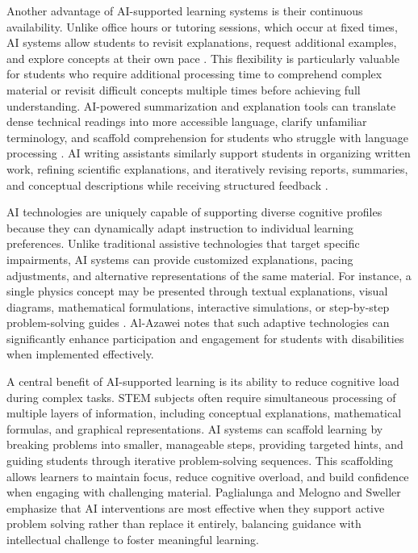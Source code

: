 \documentclass[]{aastex701}
\begin{document}
Another advantage of AI-supported learning systems is their continuous availability. Unlike office hours or tutoring sessions, which occur at fixed times, AI systems allow students to revisit explanations, request additional examples, and explore concepts at their own pace \autocite{Khowaja2025}. This flexibility is particularly valuable for students who require additional processing time to comprehend complex material or revisit difficult concepts multiple times before achieving full understanding. AI-powered summarization and explanation tools can translate dense technical readings into more accessible language, clarify unfamiliar terminology, and scaffold comprehension for students who struggle with language processing \autocite{Voultsiou2025, HarkinsBrown2025}. AI writing assistants similarly support students in organizing written work, refining scientific explanations, and iteratively revising reports, summaries, and conceptual descriptions while receiving structured feedback \autocite{Voultsiou2025, HarkinsBrown2025}.

AI technologies are uniquely capable of supporting diverse cognitive profiles because they can dynamically adapt instruction to individual learning preferences. Unlike traditional assistive technologies that target specific impairments, AI systems can provide customized explanations, pacing adjustments, and alternative representations of the same material. For instance, a single physics concept may be presented through textual explanations, visual diagrams, mathematical formulations, interactive simulations, or step-by-step problem-solving guides \autocite{Voultsiou2025, Khowaja2025}. Al-Azawei \autocite{AlAzawei2023} notes that such adaptive technologies can significantly enhance participation and engagement for students with disabilities when implemented effectively.

A central benefit of AI-supported learning is its ability to reduce cognitive load during complex tasks. STEM subjects often require simultaneous processing of multiple layers of information, including conceptual explanations, mathematical formulas, and graphical representations. AI systems can scaffold learning by breaking problems into smaller, manageable steps, providing targeted hints, and guiding students through iterative problem-solving sequences. This scaffolding allows learners to maintain focus, reduce cognitive overload, and build confidence when engaging with challenging material. Paglialunga and Melogno \autocite{Paglialunga2025} and Sweller \autocite{Sweller2011} emphasize that AI interventions are most effective when they support active problem solving rather than replace it entirely, balancing guidance with intellectual challenge to foster meaningful learning.
\end{document}
